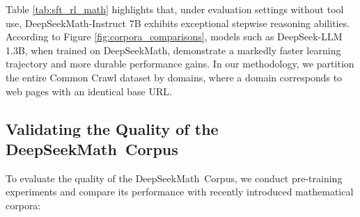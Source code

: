 Table \ref{tab:sft_rl_math} highlights that, under evaluation settings without tool use, DeepSeekMath-Instruct 7B exhibits exceptional stepwise reasoning abilities. According to Figure \ref{fig:corpora_comparisons}, models such as DeepSeek-LLM 1.3B, when trained on DeepSeekMath, demonstrate a markedly faster learning trajectory and more durable performance gains. In our methodology, we partition the entire Common Crawl dataset by domains, where a domain corresponds to web pages with an identical base URL. \subsection{Validating the Quality of the DeepSeekMath~Corpus}

To evaluate the quality of the DeepSeekMath~Corpus, we conduct pre-training experiments and compare its performance with recently introduced mathematical corpora:

